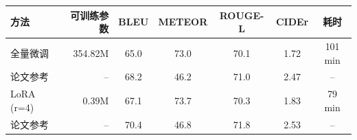 \begin{tabular}{l r c c c c c}
\toprule
方法 & 可训练参数 & BLEU & METEOR & ROUGE-L & CIDEr & 耗时 \\
\midrule
全量微调 & 354.82M & 65.0 & 73.0 & 70.1 & 1.72 & 101 min \\
\quad 论文参考 & -- & 68.2 & 46.2 & 71.0 & 2.47 & -- \\
LoRA (r=4) & 0.39M & 67.1 & 73.7 & 70.3 & 1.83 & 79 min \\
\quad 论文参考 & -- & 70.4 & 46.8 & 71.8 & 2.53 & -- \\
\bottomrule
\end{tabular}